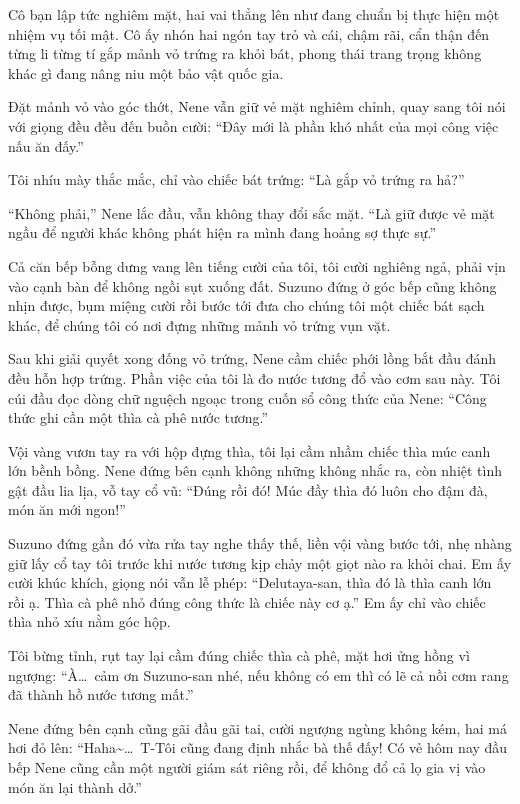 \documentclass[../main.tex]{subfiles}
\begin{document}
Cô bạn lập tức nghiêm mặt, hai vai thẳng lên như đang chuẩn bị thực hiện một nhiệm vụ tối mật. Cô ấy nhón hai ngón tay trỏ và cái, chậm rãi, cẩn thận đến từng li từng tí gắp mảnh vỏ trứng ra khỏi bát, phong thái trang trọng không khác gì đang nâng niu một bảo vật quốc gia.

Đặt mảnh vỏ vào góc thớt, Nene vẫn giữ vẻ mặt nghiêm chỉnh, quay sang tôi nói với giọng đều đều đến buồn cười: ``Đây mới là phần khó nhất của mọi công việc nấu ăn đấy.''

Tôi nhíu mày thắc mắc, chỉ vào chiếc bát trứng: ``Là gắp vỏ trứng ra hả?''

``Không phải,'' Nene lắc đầu, vẫn không thay đổi sắc mặt. ``Là giữ được vẻ mặt ngầu để người khác không phát hiện ra mình đang hoảng sợ thực sự.''

Cả căn bếp bỗng dưng vang lên tiếng cười của tôi, tôi cười nghiêng ngả, phải vịn vào cạnh bàn để không ngồi sụt xuống đất. Suzuno đứng ở góc bếp cũng không nhịn được, bụm miệng cười rồi bước tới đưa cho chúng tôi một chiếc bát sạch khác, để chúng tôi có nơi đựng những mảnh vỏ trứng vụn vặt.

Sau khi giải quyết xong đống vỏ trứng, Nene cầm chiếc phới lồng bắt đầu đánh đều hỗn hợp trứng. Phần việc của tôi là đo nước tương đổ vào cơm sau này. Tôi cúi đầu đọc dòng chữ nguệch ngoạc trong cuốn sổ công thức của Nene: ``Công thức ghi cần một thìa cà phê nước tương.''

Vội vàng vươn tay ra với hộp đựng thìa, tôi lại cầm nhầm chiếc thìa múc canh lớn bềnh bồng. Nene đứng bên cạnh không những không nhắc ra, còn nhiệt tình gật đầu lia lịa, vỗ tay cổ vũ: ``Đúng rồi đó! Múc đầy thìa đó luôn cho đậm đà, món ăn mới ngon!''

Suzuno đứng gần đó vừa rửa tay nghe thấy thế, liền vội vàng bước tới, nhẹ nhàng giữ lấy cổ tay tôi trước khi nước tương kịp chảy một giọt nào ra khỏi chai. Em ấy cười khúc khích, giọng nói vẫn lễ phép: ``Delutaya-san, thìa đó là thìa canh lớn rồi ạ. Thìa cà phê nhỏ đúng công thức là chiếc này cơ ạ.'' Em ấy chỉ vào chiếc thìa nhỏ xíu nằm góc hộp.

Tôi bừng tỉnh, rụt tay lại cầm đúng chiếc thìa cà phê, mặt hơi ửng hồng vì ngượng: ``À\dots\ cảm ơn Suzuno-san nhé, nếu không có em thì có lẽ cả nồi cơm rang đã thành hồ nước tương mất.''

Nene đứng bên cạnh cũng gãi đầu gãi tai, cười ngượng ngùng không kém, hai má hơi đỏ lên: ``Haha\~{}\dots\ T-Tôi cũng đang định nhắc bà thế đấy! Có vẻ hôm nay đầu bếp Nene cũng cần một người giám sát riêng rồi, để không đổ cả lọ gia vị vào món ăn lại thành dở.''
\end{document}
